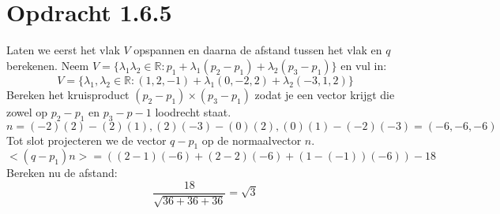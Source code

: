 \documentclass{article}
\begin{document}
\section*{Opdracht 1.6.5}
Laten we eerst het vlak $V$ opspannen en daarna de afstand tussen het vlak en $q$ berekenen.
Neem $V = \{ \lambda_1 \lambda_2 \in \mathbb{R} : p_1 + \lambda_1 (p_2-p_1) + \lambda_2 (p_3-p_1) \}$ en vul in:
\[ V = \{ \lambda_1, \lambda_2 \in \mathbb{R} : (1,2,-1) + \lambda_1(0,-2,2) + \lambda_2(-3, 1, 2) \} \]
Bereken het kruisproduct $(p_2 - p_1) \times (p_3 - p_1)$ zodat je een vector krijgt die zowel op $p_2 - p_1$ en $p_3-p-1$ loodrecht staat.
\[n=(-2)(2) - (2)(1), (2)(-3)- (0)(2), (0)(1)-(-2)(-3) = (-6,-6,-6) \]
Tot slot projecteren we de vector $q-p_1$ op de normaalvector $n$.
\[ <(q-p_1)n> = ((2-1)(-6)+(2-2)(-6)+(1-(-1))(-6))-18 \]
Bereken nu de afstand:
\[\frac{18}{\sqrt{36+36+36}} = \boxed{\sqrt{3}}\]
\end{document}
